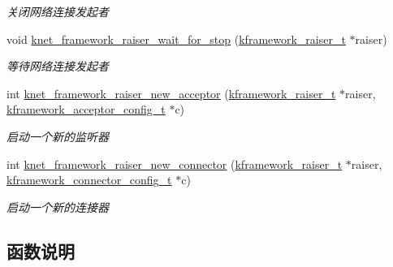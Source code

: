 \begin{DoxyCompactItemize}
\begin{DoxyCompactList}\small\item\em 关闭网络连接发起者 \end{DoxyCompactList}\item 
void \hyperlink{a00064_afcada6a8c7bb6d0d91c55df37352f5fb_afcada6a8c7bb6d0d91c55df37352f5fb}{knet\+\_\+framework\+\_\+raiser\+\_\+wait\+\_\+for\+\_\+stop} (\hyperlink{a00056_af10637001508cbbf3a84f95c71318532_af10637001508cbbf3a84f95c71318532}{kframework\+\_\+raiser\+\_\+t} $\ast$raiser)
\begin{DoxyCompactList}\small\item\em 等待网络连接发起者 \end{DoxyCompactList}\item 
int \hyperlink{a00064_a1fa517b4b3e577a30f12f5b77dfaa9a3_a1fa517b4b3e577a30f12f5b77dfaa9a3}{knet\+\_\+framework\+\_\+raiser\+\_\+new\+\_\+acceptor} (\hyperlink{a00056_af10637001508cbbf3a84f95c71318532_af10637001508cbbf3a84f95c71318532}{kframework\+\_\+raiser\+\_\+t} $\ast$raiser, \hyperlink{a00056_a39c993eb450173e4fde04498d757f9b6_a39c993eb450173e4fde04498d757f9b6}{kframework\+\_\+acceptor\+\_\+config\+\_\+t} $\ast$c)
\begin{DoxyCompactList}\small\item\em 启动一个新的监听器 \end{DoxyCompactList}\item 
int \hyperlink{a00064_af58dbe8c5764d42ecb712d4a93391d11_af58dbe8c5764d42ecb712d4a93391d11}{knet\+\_\+framework\+\_\+raiser\+\_\+new\+\_\+connector} (\hyperlink{a00056_af10637001508cbbf3a84f95c71318532_af10637001508cbbf3a84f95c71318532}{kframework\+\_\+raiser\+\_\+t} $\ast$raiser, \hyperlink{a00056_a44d3033eba5a4fd784a741700a7a2521_a44d3033eba5a4fd784a741700a7a2521}{kframework\+\_\+connector\+\_\+config\+\_\+t} $\ast$c)
\begin{DoxyCompactList}\small\item\em 启动一个新的连接器 \end{DoxyCompactList}\end{DoxyCompactItemize}


\subsection{函数说明}
\hypertarget{a00064_a2b6bd6bd9b9c60ab24eab0c0700bc855_a2b6bd6bd9b9c60ab24eab0c0700bc855}{}
